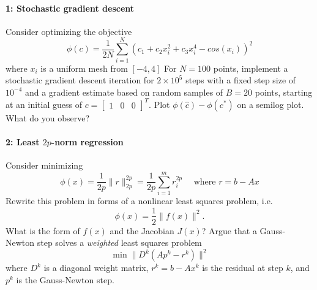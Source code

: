 \documentclass[12pt, leqno]{article} %
\begin{document}

\paragraph*{1: Stochastic gradient descent}
Consider optimizing the objective
\[
  \phi(c) = \frac{1}{2N} \sum_{i=1}^{N}
    (c_1 + c_2 x_i^2 + c_3 x_i^4 - cos(x_i))^2
\]
where $x_i$ is a uniform mesh from $[-4, 4]$  
For $N = 100$ points, implement a stochastic gradient descent
iteration for $2 \times 10^5$ steps with a fixed step size of
$10^{-4}$ and a gradient estimate based on random samples of $B = 20$ points,
starting at an initial guess of
$c = \begin{bmatrix} 1 & 0 & 0 \end{bmatrix}^T$.
Plot $\phi(\hat{c}) - \phi(c^*)$ on a semilog plot.
What do you observe?

\paragraph*{2: Least $2p$-norm regression}
Consider minimizing
\[
  \phi(x) = \frac{1}{2p} \|r\|_{2p}^{2p} = \frac{1}{2p} \sum_{i=1}^m r_i^{2p}
  \quad \mbox{ where }
  r = b-Ax
\]
Rewrite this problem in forms of a nonlinear least squares
problem, i.e.
\[
  \phi(x) = \frac{1}{2} \|f(x)\|^2.
\]
What is the form of $f(x)$ and the Jacobian $J(x)$?  Argue that a
Gauss-Newton step solves a {\em weighted} least squares problem
\[
  \min \|D^k (Ap^k - r^k)\|^2
\]
where $D^k$ is a diagonal weight matrix, $r^k = b-Ax^k$ is the
residual at step $k$, and $p^k$ is the Gauss-Newton step.
\end{document}
